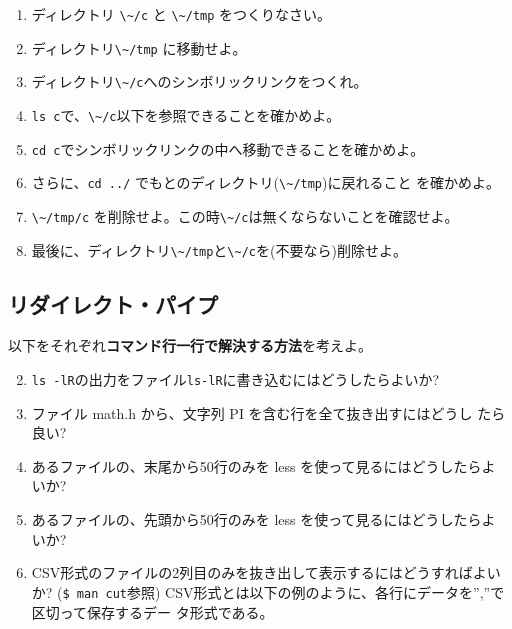 \documentclass[11pt, twocolumn, ]{jsarticle}
\providecommand{\tightlist}{%
   \setlength{\itemsep}{0pt}\setlength{\parskip}{0pt}}
\begin{document}
\begin{enumerate}
\item
  ディレクトリ \passthrough{\lstinline!\~/c!} と
  \passthrough{\lstinline!\~/tmp!} をつくりなさい。
\item
  ディレクトリ\passthrough{\lstinline!\~/tmp!} に移動せよ。
\item
  ディレクトリ\passthrough{\lstinline!\~/c!}へのシンボリックリンクをつくれ。
\item
  \passthrough{\lstinline!ls c!}で、\passthrough{\lstinline!\~/c!}以下を参照できることを確かめよ。
\item
  \passthrough{\lstinline!cd c!}でシンボリックリンクの中へ移動できることを確かめよ。
\item
  さらに、\passthrough{\lstinline!cd ../!}
  でもとのディレクトリ(\passthrough{\lstinline!\~/tmp!})に戻れること
  を確かめよ。
\item
  \passthrough{\lstinline!\~/tmp/c!}
  を削除せよ。この時\passthrough{\lstinline!\~/c!}は無くならないことを確認せよ。
\item
  最後に、ディレクトリ\passthrough{\lstinline!\~/tmp!}と\passthrough{\lstinline!\~/c!}を(不要なら)削除せよ。
\end{enumerate}

\hypertarget{ux30eaux30c0ux30a4ux30ecux30afux30c8ux30d1ux30a4ux30d7}{%
\subsection{リダイレクト・パイプ}\label{ux30eaux30c0ux30a4ux30ecux30afux30c8ux30d1ux30a4ux30d7}}

以下をそれぞれ\textbf{コマンド行一行で解決する方法}を考えよ。

\begin{enumerate}
\setcounter{enumi}{1}
\tightlist
\item
  \passthrough{\lstinline!ls -lR!}の出力をファイル\passthrough{\lstinline!ls-lR!}に書き込むにはどうしたらよいか?
\item
  ファイル math.h から、文字列 PI を含む行を全て抜き出すにはどうし
  たら良い?
\item
  あるファイルの、末尾から50行のみを less を使って見るにはどうしたらよ
  いか?
\item
  あるファイルの、先頭から50行のみを less を使って見るにはどうしたらよ
  いか?
\item
  CSV形式のファイルの2列目のみを抜き出して表示するにはどうすればよいか?
  (\passthrough{\lstinline!$ man cut!}参照)
  CSV形式とは以下の例のように、各行にデータを'',''で区切って保存するデー
  タ形式である。
\end{enumerate}
\end{document}
